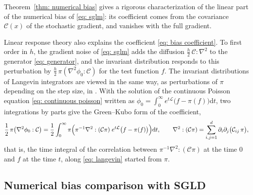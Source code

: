 \documentclass{article}
\newcommand{\D}{\mathrm{d}}
\numberwithin{equation}{section}
\begin{document}
Theorem~\ref{thm: numerical bias} gives a rigorous characterization of the linear part of the numerical bias of \eqref{eq: sglm}: its coefficient comes from the covariance $\mathcal C(x)$ of the stochastic gradient, and vanishes with the full gradient.

Linear response theory \citep{kubo1957statistical, hairer2010simple} also explains the coefficient \eqref{eq: bias coefficient}. To first order in $h$, the gradient noise of \eqref{eq: sglm} adds the diffusion $\frac h2\, \mathcal C : \nabla^2$ to the generator \eqref{eq: generator}, and the invariant distribution responds to this perturbation by $\frac h2\, \pi(\nabla^2 \phi_0 : \mathcal C)$ for the test function $f$. The invariant distributions of Langevin integrators are viewed in the same way, as perturbations of $\pi$ depending on the step size, in \citep{leimkuhler2015computation}. With the solution of the continuous Poisson equation \eqref{eq: continuous poisson} written as $\phi_0 = \int_0^\infty e^{t\mathcal L} \bigl( f - \pi(f) \bigr) \D t$, two integrations by parts give the Green--Kubo form \citep{green1954markoff, kubo1957statistical} of the coefficient,
\begin{equation*}
    \frac12\, \pi\bigl( \nabla^2 \phi_0 : \mathcal C \bigr) = \frac12 \int_0^\infty \pi\Bigl( \pi^{-1}
     \nabla^2 : (\mathcal C \pi)\; e^{t\mathcal L} \bigl( f - \pi(f) \bigr) \Bigr) \D t , \qquad \nabla^2 : (\mathcal C \pi) = \sum_{i,j=1}^d \partial_i \partial_j \bigl( \mathcal C_{ij}\, \pi \bigr) ,
\end{equation*}
that is, the time integral of the correlation between $\pi^{-1} \nabla^2 : (\mathcal C \pi)$ at the time $0$ and $f$ at the time $t$, along \eqref{eq: langevin} started from $\pi$.

\subsection{Numerical bias comparison with SGLD}
\label{subsec: sgld}
\end{document}
